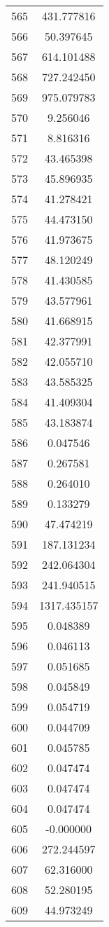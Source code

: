 \documentclass[12pt]{article}
\begin{document}
\begin{longtable}{@{}cc@{}}
565 & 431.777816 \\
566 & 50.397645 \\
567 & 614.101488 \\
568 & 727.242450 \\
569 & 975.079783 \\
570 & 9.256046 \\
571 & 8.816316 \\
572 & 43.465398 \\
573 & 45.896935 \\
574 & 41.278421 \\
575 & 44.473150 \\
576 & 41.973675 \\
577 & 48.120249 \\
578 & 41.430585 \\
579 & 43.577961 \\
580 & 41.668915 \\
581 & 42.377991 \\
582 & 42.055710 \\
583 & 43.585325 \\
584 & 41.409304 \\
585 & 43.183874 \\
586 & 0.047546 \\
587 & 0.267581 \\
588 & 0.264010 \\
589 & 0.133279 \\
590 & 47.474219 \\
591 & 187.131234 \\
592 & 242.064304 \\
593 & 241.940515 \\
594 & 1317.435157 \\
595 & 0.048389 \\
596 & 0.046113 \\
597 & 0.051685 \\
598 & 0.045849 \\
599 & 0.054719 \\
600 & 0.044709 \\
601 & 0.045785 \\
602 & 0.047474 \\
603 & 0.047474 \\
604 & 0.047474 \\
605 & -0.000000 \\
606 & 272.244597 \\
607 & 62.316000 \\
608 & 52.280195 \\
609 & 44.973249 \\

\end{longtable}
\end{document}
